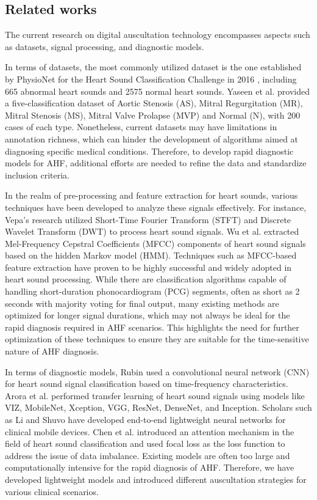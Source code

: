 \subsection{Related works}
The current research on digital auscultation technology encompasses aspects such as datasets, signal processing, and diagnostic models.

In terms of datasets, the most commonly utilized dataset is the one established by PhysioNet for the Heart Sound Classification Challenge in 2016 \cite{clifford2016classification}, including 665 abnormal heart sounds and 2575 normal heart sounds. Yaseen et al. \cite{son2018classification} provided a five-classification dataset of Aortic Stenosis (AS), Mitral Regurgitation (MR), Mitral Stenosis (MS), Mitral Valve Prolapse (MVP) and Normal (N), with 200 cases of each type. Nonetheless, current datasets may have limitations in annotation richness, which can hinder the development of algorithms aimed at diagnosing specific medical conditions. Therefore, to develop rapid diagnostic models for AHF, additional efforts are needed to refine the data and standardize inclusion criteria.

In the realm of pre-processing and feature extraction for heart sounds, various techniques have been developed to analyze these signals effectively. For instance, Vepa's research \cite{vepa2009classification} utilized Short-Time Fourier Transform (STFT) and Discrete Wavelet Transform (DWT) to process heart sound signals. Wu et al. \cite{wu2010hidden} extracted Mel-Frequency Cepstral Coefficients (MFCC) components of heart sound signals based on the hidden Markov model (HMM). Techniques such as MFCC-based feature extraction have proven to be highly successful and widely adopted in heart sound processing. While there are classification algorithms capable of handling short-duration phonocardiogram (PCG) segments, often as short as 2 seconds with majority voting for final output, many existing methods are optimized for longer signal durations, which may not always be ideal for the rapid diagnosis required in AHF scenarios. This highlights the need for further optimization of these techniques to ensure they are suitable for the time-sensitive nature of AHF diagnosis.

In terms of diagnostic models, Rubin \cite{rubin2016classifying} used a convolutional neural network (CNN) for heart sound signal classification based on time-frequency characteristics. Arora et al. \cite{arora2021transfer,xiang2023research} performed transfer learning of heart sound signals using models like VIZ, MobileNet, Xception, VGG, ResNet, DenseNet, and Inception. Scholars such as Li and Shuvo \cite{li2021lightweight,shuvo2021cardioxnet} have developed end-to-end lightweight neural networks for clinical mobile devices. Chen et al. \cite{chen2023robust} introduced an attention mechanism in the field of heart sound classification and used focal loss as the loss function to address the issue of data imbalance. Existing models are often too large and computationally intensive for the rapid diagnosis of AHF. Therefore, we have developed lightweight models and introduced different auscultation strategies for various clinical scenarios.


